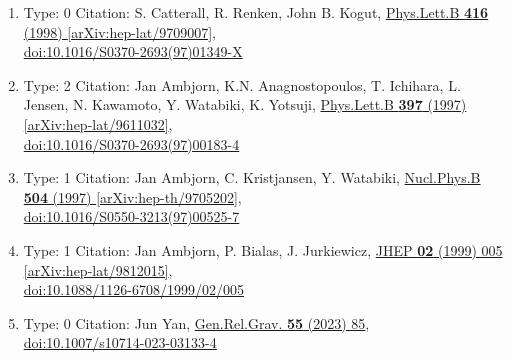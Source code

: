 \documentclass[a4paper,10pt]{article}
\begin{document}
\begin{enumerate}
\begin{enumerate}
  \item Type: 0 Citation: S. Catterall, R. Renken, John B. Kogut, \href{https://www.doi.org/10.1016/S0370-2693(97)01349-X}{Phys.Lett.B {\bf 416} (1998) }  \href{https://arxiv.org/abs/hep-lat/9709007}{[arXiv:hep-lat/9709007]},\\\href{https://www.doi.org/10.1016/S0370-2693(97)01349-X}{doi:10.1016/S0370-2693(97)01349-X}
  \item Type: 2 Citation: Jan Ambjorn, K.N. Anagnostopoulos, T. Ichihara, L. Jensen, N. Kawamoto, Y. Watabiki, K. Yotsuji, \href{https://www.doi.org/10.1016/S0370-2693(97)00183-4}{Phys.Lett.B {\bf 397} (1997) }  \href{https://arxiv.org/abs/hep-lat/9611032}{[arXiv:hep-lat/9611032]},\\\href{https://www.doi.org/10.1016/S0370-2693(97)00183-4}{doi:10.1016/S0370-2693(97)00183-4}
  \item Type: 1 Citation: Jan Ambjorn, C. Kristjansen, Y. Watabiki, \href{https://www.doi.org/10.1016/S0550-3213(97)00525-7}{Nucl.Phys.B {\bf 504} (1997) }  \href{https://arxiv.org/abs/hep-th/9705202}{[arXiv:hep-th/9705202]},\\\href{https://www.doi.org/10.1016/S0550-3213(97)00525-7}{doi:10.1016/S0550-3213(97)00525-7}
  \item Type: 1 Citation: Jan Ambjorn, P. Bialas, J. Jurkiewicz, \href{https://www.doi.org/10.1088/1126-6708/1999/02/005}{JHEP {\bf 02} (1999) 005}  \href{https://arxiv.org/abs/hep-lat/9812015}{[arXiv:hep-lat/9812015]},\\\href{https://www.doi.org/10.1088/1126-6708/1999/02/005}{doi:10.1088/1126-6708/1999/02/005}
  \item Type: 0 Citation: Jun Yan, \href{https://www.doi.org/10.1007/s10714-023-03133-4}{Gen.Rel.Grav. {\bf 55} (2023) 85},\\\href{https://www.doi.org/10.1007/s10714-023-03133-4}{doi:10.1007/s10714-023-03133-4}

\end{enumerate}
\end{enumerate}
\end{document}
